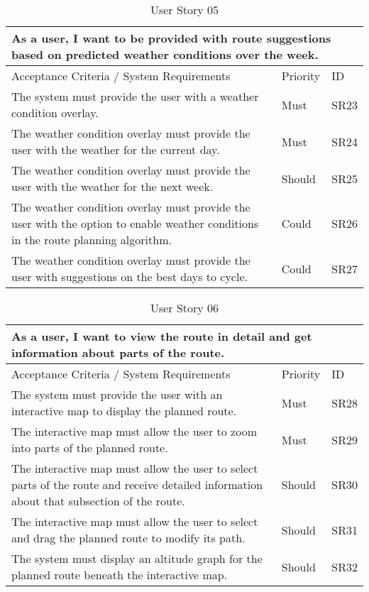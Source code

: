 \begin{table}[!htb]
\caption{User Story 05}
\label{tab:user-story-05}
\begin{tabular}{ p{11cm} p{1cm}  p{1cm} }
\hline
\multicolumn{3}{p{13cm}}{As a user, I want to be provided with route suggestions based on predicted weather conditions over the week.}\\ 
\hline
Acceptance Criteria / System Requirements & Priority & ID\\
\hline
The system must provide the user with a weather condition overlay. & Must & SR23 \\
The weather condition overlay must provide the user with the weather for the current day. & Must & SR24\\
The weather condition overlay must provide the user with the weather for the next week. & Should & SR25\\
The weather condition overlay must provide the user with the option to enable weather conditions in the route planning algorithm. & Could & SR26\\ 
The weather condition overlay must provide the user with suggestions on the best days to cycle. & Could & SR27\\ 
\hline
\end{tabular}
\end{table}

\begin{table}[!htb]
\caption{User Story 06}
\label{tab:user-story-06}
\begin{tabular}{ p{11cm} p{1cm}  p{1cm} }
\hline
\multicolumn{3}{p{13cm}}{As a user, I want to view the route in detail and get information about parts of the route.}\\ 
\hline
Acceptance Criteria / System Requirements & Priority & ID\\
\hline
The system must provide the user with an interactive map to display the planned route. & Must & SR28 \\
The interactive map must allow the user to zoom into parts of the planned route. & Must & SR29\\
The interactive map must allow the user to select parts of the route and receive detailed information about that subsection of the route. & Should & SR30\\
The interactive map must allow the user to select and drag the planned route to modify its path. & Should & SR31\\ 
The system must display an altitude graph for the planned route beneath the interactive map. & Should & SR32\\ 
\hline
\end{tabular}
\end{table}

